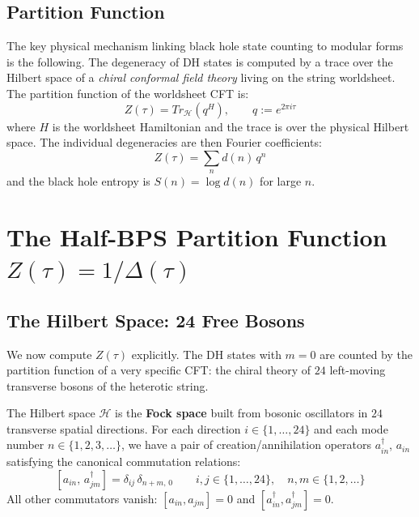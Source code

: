 \subsection{Partition Function}

The key physical mechanism linking black hole state counting to modular forms 
is the following. The degeneracy of DH states is computed by a trace over the 
Hilbert space of a \emph{chiral conformal field theory} living on the string 
worldsheet. The partition function 
of the worldsheet CFT is:
\begin{equation}
    Z(\tau) = Tr_{\mathcal{H}}\left(q^{H}\right), \qquad q := e^{2\pi i \tau}
\end{equation}
where $H$ is the worldsheet Hamiltonian and the trace is over the physical 
Hilbert space. The individual degeneracies are 
then Fourier coefficients:
\begin{equation}
    Z(\tau) = \sum_n d(n)\, q^n
\end{equation}
and the black hole entropy is $S(n) = \log d(n)$ for large $n$.

\section{The Half-BPS Partition Function $Z(\tau) = 1/\Delta(\tau)$}

\subsection{The Hilbert Space: 24 Free Bosons}

We now compute $Z(\tau)$ explicitly. The DH states with $m=0$ are counted by 
the partition function of a very specific CFT: the chiral theory of $24$ 
left-moving transverse bosons of the heterotic string.

The Hilbert space $\mathcal{H}$ is the \textbf{Fock space} built from bosonic 
oscillators in $24$ transverse spatial directions. For each direction 
$i \in \{1,\ldots,24\}$ and each mode number $n \in \{1,2,3,\ldots\}$, 
we have a pair of creation/annihilation operators $a^\dagger_{in}$, $a_{in}$ 
satisfying the canonical commutation relations:
\begin{equation}\label{CCR}
    [a_{in},\, a^\dagger_{jm}] = \delta_{ij}\,\delta_{n+m,\,0}
    \qquad i,j \in \{1,\ldots,24\},\quad n,m \in \{1,2,\ldots\}
\end{equation}
All other commutators vanish: $[a_{in}, a_{jm}] = 0$ and 
$[a^\dagger_{in}, a^\dagger_{jm}] = 0$.

